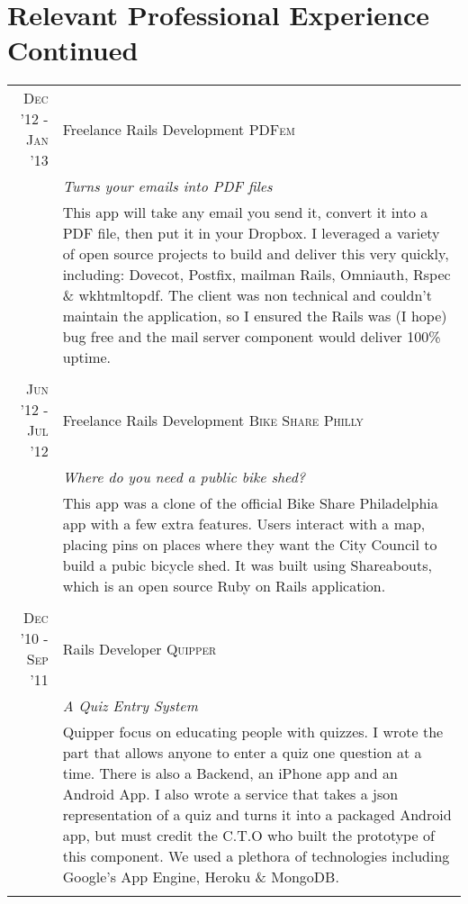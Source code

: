 \documentclass[a4paper,11pt]{article}
\begin{document}
\section{Relevant Professional Experience Continued}
\begin{tabular}{r|p{11.2cm}}
  \textsc{Dec '12 - Jan '13} & Freelance Rails Development \textsc{PDFem} \\
                             &\emph{Turns your emails into PDF files}\\
                             &\footnotesize{This app will take any email you send it, convert it into a PDF
  file, then put it in your Dropbox. I leveraged a variety of open source projects to build and
  deliver this very quickly, including: Dovecot, Postfix, mailman Rails, Omniauth, Rspec \&
  wkhtmltopdf. The client was non technical and couldn't maintain the application, so I ensured the
  Rails was (I hope) bug free and the mail server component would deliver 100\% uptime.}
  \\\multicolumn{2}{c}{} \\
  \textsc{Jun '12 - Jul '12} & Freelance Rails Development \textsc{Bike Share Philly} \\
                             &\emph{Where do you need a public bike shed?}\\
                             &\footnotesize{This app was a clone of the official Bike Share Philadelphia
  app with a few extra features. Users interact with a map, placing pins on places where they want the City
  Council to build a pubic bicycle shed. It was built using Shareabouts, which is an open source
  Ruby on Rails application. }
  \\\multicolumn{2}{c}{} \\
  \textsc{Dec '10 - Sep '11} & Rails Developer \textsc{Quipper} \\
                             &\emph{A Quiz Entry System}\\
                             &\footnotesize{Quipper focus on educating people with quizzes. I wrote the
  part that allows anyone to enter a quiz one question at a time. There is also a Backend, an
  iPhone app and an Android App. I also wrote a service that takes a json representation of a quiz and turns it into
  a packaged Android app, but must credit the C.T.O who built the prototype of this component. We
  used a plethora of technologies including Google's App Engine, Heroku \& MongoDB.}
  \\\multicolumn{2}{c}{} \\

\end{tabular}
\end{document}
